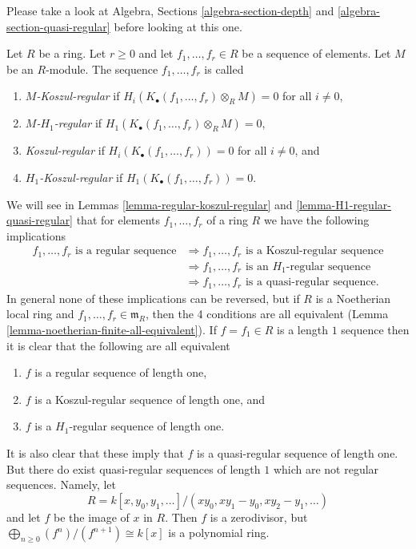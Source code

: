 \noindent
Please take a look at
Algebra, Sections \ref{algebra-section-depth} and
\ref{algebra-section-quasi-regular}
before looking at this one.

\begin{definition}
\label{definition-koszul-regular-sequence}
Let $R$ be a ring. Let $r \geq 0$ and let $f_1, \ldots, f_r \in R$
be a sequence of elements. Let $M$ be an $R$-module.
The sequence $f_1, \ldots, f_r$ is called
\begin{enumerate}
\item {\it $M$-Koszul-regular} if
$H_i(K_\bullet(f_1, \ldots, f_r) \otimes_R M) = 0$ for
all $i \not = 0$,
\item {\it $M$-$H_1$-regular} if
$H_1(K_\bullet(f_1, \ldots, f_r) \otimes_R M) = 0$,
\item {\it Koszul-regular} if $H_i(K_\bullet(f_1, \ldots, f_r)) = 0$ for
all $i \not = 0$, and
\item {\it $H_1$-Koszul-regular} if $H_1(K_\bullet(f_1, \ldots, f_r)) = 0$.
\end{enumerate}
\end{definition}

\noindent
We will see in Lemmas \ref{lemma-regular-koszul-regular} and
\ref{lemma-H1-regular-quasi-regular} that for elements
$f_1, \ldots, f_r$ of a ring $R$ we have the following implications
\begin{align*}
f_1, \ldots, f_r\text{ is a regular sequence}
& \Rightarrow f_1, \ldots, f_r\text{ is a Koszul-regular sequence} \\
& \Rightarrow f_1, \ldots, f_r\text{ is an }H_1\text{-regular sequence} \\
& \Rightarrow f_1, \ldots, f_r\text{ is a quasi-regular sequence.}
\end{align*}
In general none of these implications can be reversed, but if $R$ is
a Noetherian local ring and $f_1, \ldots, f_r \in \mathfrak m_R$,
then the 4 conditions are all equivalent
(Lemma \ref{lemma-noetherian-finite-all-equivalent}).
If $f = f_1 \in R$ is a length $1$ sequence then it is clear that the
following are all equivalent
\begin{enumerate}
\item $f$ is a regular sequence of length one,
\item $f$ is a Koszul-regular sequence of length one, and
\item $f$ is a $H_1$-regular sequence of length one.
\end{enumerate}
It is also clear that these imply that $f$ is a quasi-regular sequence
of length one. But there do exist quasi-regular sequences of length $1$
which are not regular sequences. Namely, let
$$
R = k[x, y_0, y_1, \ldots]/(xy_0, xy_1 - y_0, xy_2 - y_1, \ldots)
$$
and let $f$ be the image of $x$ in $R$. Then $f$ is a zerodivisor, but
$\bigoplus_{n \geq 0} (f^n)/(f^{n + 1}) \cong k[x]$ is a polynomial ring.


